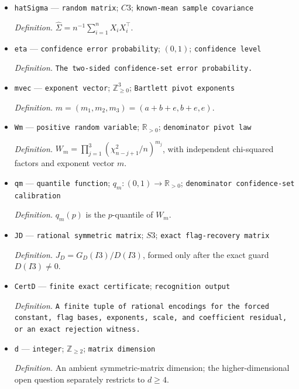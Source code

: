 \documentclass{article}
\begin{document}
\begin{itemize}
  \item \texttt{hatSigma} --- \texttt{random matrix}; \(C3\); \texttt{known-\allowbreak{}mean sample covariance}
  \par\smallskip\noindent\emph{Definition.} \(\widehat\Sigma=n^{-1}\sum_{i=1}^{n}X_iX_i^{\top}\).
  \item \texttt{eta} --- \texttt{confidence error probability}; \((0,1)\); \texttt{confidence level}
  \par\smallskip\noindent\emph{Definition.} \texttt{The two-\allowbreak{}sided confidence-\allowbreak{}set error probability.}
  \item \texttt{mvec} --- \texttt{exponent vector}; \(\mathbb Z_{\geq0}^{3}\); \texttt{Bartlett pivot exponents}
  \par\smallskip\noindent\emph{Definition.} \(m=(m_1,m_2,m_3)=(a+b+e,b+e,e)\).
  \item \texttt{Wm} --- \texttt{positive random variable}; \(\mathbb R_{>0}\); \texttt{denominator pivot law}
  \par\smallskip\noindent\emph{Definition.} \(W_m=\prod_{j=1}^{3}(\chi^2_{n-j+1}/n)^{m_j}\), with independent chi-squared factors and exponent vector \(m\).
  \item \texttt{qm} --- \texttt{quantile function}; \(q_m:(0,1)\to\mathbb R_{>0}\); \texttt{denominator confidence-\allowbreak{}set calibration}
  \par\smallskip\noindent\emph{Definition.} \(q_m(p)\) is the \(p\)-quantile of \(W_m\).
  \item \texttt{JD} --- \texttt{rational symmetric matrix}; \(S3\); \texttt{exact flag-\allowbreak{}recovery matrix}
  \par\smallskip\noindent\emph{Definition.} \(J_D=G_D(I3)/D(I3)\), formed only after the exact guard \(D(I3)\neq0\).
  \item \texttt{CertD} --- \texttt{finite exact certificate}; \texttt{recognition output}
  \par\smallskip\noindent\emph{Definition.} \texttt{A finite tuple of rational encodings for the forced constant,\allowbreak{} flag bases,\allowbreak{} exponents,\allowbreak{} scale,\allowbreak{} and coefficient residual,\allowbreak{} or an exact rejection witness.}
  \item \texttt{d} --- \texttt{integer}; \(\mathbb Z_{\geq2}\); \texttt{matrix dimension}
  \par\smallskip\noindent\emph{Definition.} An ambient symmetric-matrix dimension; the higher-dimensional open question separately restricts to \(d\geq4\).

\end{itemize}
\end{document}
